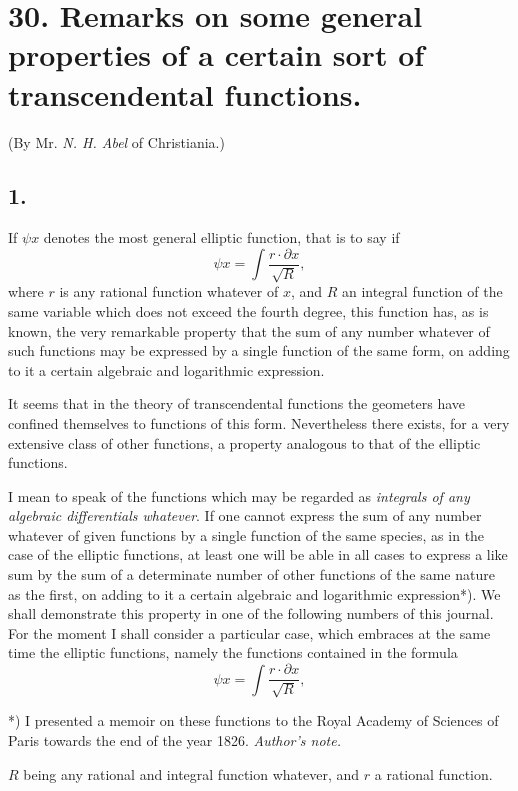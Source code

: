 \documentclass{article}
\begin{document}
\section*{30. Remarks on some general properties of a certain sort of transcendental functions.}

(By Mr. \emph{N. H. Abel} of Christiania.)

\subsection*{1.}

If $\psi x$ denotes the most general elliptic function, that is to say if
\[ \psi x = \int \frac{r \cdot \partial x}{\sqrt{R}}, \]
where $r$ is any rational function whatever of $x$, and $R$ an integral function of the same variable which does not exceed the fourth degree, this function has, as is known, the very remarkable property that the sum of any number whatever of such functions may be expressed by a single function of the same form, on adding to it a certain algebraic and logarithmic expression.

It seems that in the theory of transcendental functions the geometers have confined themselves to functions of this form. Nevertheless there exists, for a very extensive class of other functions, a property analogous to that of the elliptic functions.

I mean to speak of the functions which may be regarded as \emph{integrals of any algebraic differentials whatever}. If one cannot express the sum of any number whatever of given functions by a single function of the same species, as in the case of the elliptic functions, at least one will be able in all cases to express a like sum by the sum of a determinate number of other functions of the same nature as the first, on adding to it a certain algebraic and logarithmic expression*). We shall demonstrate this property in one of the following numbers of this journal. For the moment I shall consider a particular case, which embraces at the same time the elliptic functions, namely the functions contained in the formula
\[ \psi x = \int \frac{r \cdot \partial x}{\sqrt{R}}, \tag{1} \]

*) I presented a memoir on these functions to the Royal Academy of Sciences of Paris towards the end of the year 1826. \emph{Author's note.}

$R$ being any rational and integral function whatever, and $r$ a rational function.
\end{document}
